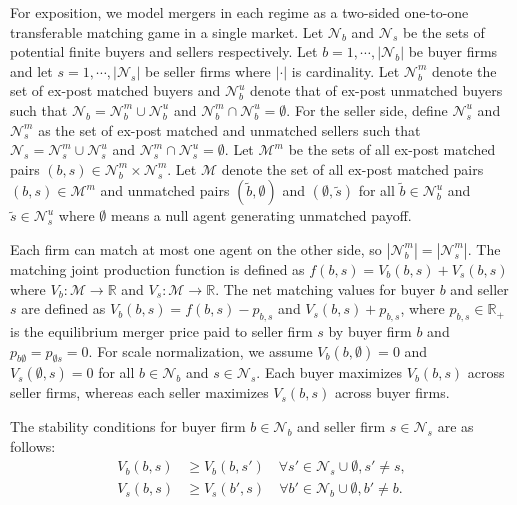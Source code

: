 \documentclass[10pt]{article}
\begin{document}
For exposition, we model mergers in each regime as a two-sided one-to-one transferable matching game in a single market. Let $\mathcal{N}_b$ and $\mathcal{N}_s$ be the sets of potential finite buyers and sellers respectively. Let $b=1,\cdots,|\mathcal{N}_b|$ be buyer firms and let $s=1,\cdots,|\mathcal{N}_s|$ be seller firms where $|\cdot|$ is cardinality. Let $\mathcal{N}_{b}^{m}$ denote the set of ex-post matched buyers and $\mathcal{N}_{b}^{u}$ denote that of ex-post unmatched buyers such that $\mathcal{N}_b= \mathcal{N}_{b}^{m}\cup\mathcal{N}_{b}^{u}$ and $\mathcal{N}_{b}^{m}\cap\mathcal{N}_{b}^{u}=\emptyset$. For the seller side, define $\mathcal{N}_{s}^{u}$ and $\mathcal{N}_{s}^{m}$ as the set of ex-post matched and unmatched sellers such that $\mathcal{N}_s= \mathcal{N}_{s}^{m}\cup\mathcal{N}_{s}^{u}$ and $\mathcal{N}_{s}^{m}\cap\mathcal{N}_{s}^{u}=\emptyset$. Let $\mathcal{M}^m$ be the sets of all ex-post matched pairs $(b,s)\in\mathcal{N}_{b}^{m}\times \mathcal{N}_{s}^{m}$. Let $\mathcal{M}$ denote the set of all ex-post matched pairs $(b,s)\in\mathcal{M}^{m}$ and unmatched pairs $(\tilde{b},\emptyset)$ and $(\emptyset,\tilde{s})$ for all $\tilde{b}\in \mathcal{N}_b^u$ and $\tilde{s}\in \mathcal{N}_s^u$ where $\emptyset$ means a null agent generating unmatched payoff. 

Each firm can match at most one agent on the other side, so  $|\mathcal{N}_b^{m}|=|\mathcal{N}_s^{m}|$. The matching joint production function is defined as $f(b,s)=V_b(b,s)+V_s(b,s)$ where $V_b:\mathcal{M}\rightarrow \mathbb{R}$ and $V_s:\mathcal{M}\rightarrow \mathbb{R}$. The net matching values for buyer $b$ and seller $s$ are defined as $V_b(b,s)=f(b,s)-p_{b,s}$ and $V_s(b,s)+p_{b,s}$, where $p_{b,s}\in \mathbb{R}_{+}$ is the equilibrium merger price paid to seller firm $s$ by buyer firm $b$ and $p_{b\emptyset}=p_{\emptyset s}=0$. For scale normalization, we assume $V_b(b,\emptyset)=0$ and $V_s(\emptyset,s)=0$ for all $b\in \mathcal{N}_b$ and $s\in \mathcal{N}_s$. Each buyer maximizes $V_b(b,s)$ across seller firms, whereas each seller maximizes $V_s(b,s)$ across buyer firms. 

The stability conditions for buyer firm $b \in \mathcal{N}_b$ and seller firm $s \in \mathcal{N}_s$ are as follows:
\begin{align}
    V_b(b,s) &\ge V_b(b,s') \quad \forall s' \in \mathcal{N}_s \cup \emptyset,s'\neq s,\label{eq:stability_ineq}\\
    V_s(b,s) &\ge V_s(b',s) \quad \forall b' \in \mathcal{N}_b\cup \emptyset,b'\neq b.\nonumber
\end{align}
\end{document}
